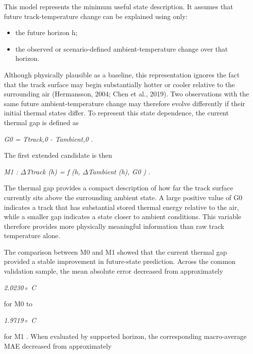 This model represents the minimum useful state description. It assumes that future track-temperature change can be explained using only:

\begin{itemize}
\item the future horizon h;
\item the observed or scenario-defined ambient-temperature change over that horizon.
\end{itemize}

Although physically plausible as a baseline, this representation ignores the fact that the track surface may begin substantially hotter or cooler relative to the surrounding air (Hermansson, 2004; Chen et al., 2019). Two observations with the same future ambient-temperature change may therefore evolve differently if their initial thermal states differ. To represent this state dependence, the current thermal gap is defined as

\begin{center}\textit{G0 = Ttrack,0 - Tambient,0 .}\end{center}

The first extended candidate is then

\begin{center}\textit{M1 :     \ensuremath{\Delta}Ttrack (h) = f (h, \ensuremath{\Delta}Tambient (h), G0 ) .}\end{center}

The thermal gap provides a compact description of how far the track surface currently sits above the surrounding ambient state. A large positive value of G0 indicates a track that has substantial stored thermal energy relative to the air, while a smaller gap indicates a state closer to ambient conditions. This variable therefore provides more physically meaningful information than raw track temperature alone.

The comparison between M0 and M1 showed that the current thermal gap provided a stable improvement in future-state prediction. Across the common validation sample, the mean absolute error decreased from approximately

\begin{center}\textit{2.0230◦ C}\end{center}

for M0 to

\begin{center}\textit{1.9719◦ C}\end{center}

for M1 . When evaluated by supported horizon, the corresponding macro-average MAE decreased from approximately

